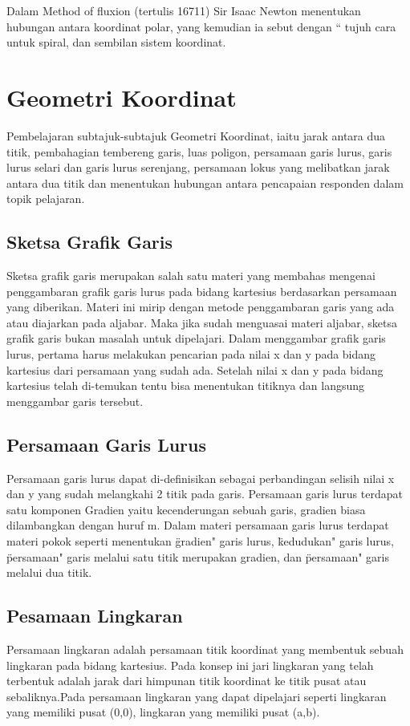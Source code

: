 Dalam Method of fluxion (tertulis 16711) Sir Isaac Newton menentukan hubungan antara koordinat polar, yang kemudian ia sebut dengan “ tujuh cara untuk spiral, dan sembilan sistem koordinat. 

\section{Geometri Koordinat}
 Pembelajaran subtajuk-subtajuk Geometri Koordinat, iaitu jarak antara dua titik, pembahagian tembereng garis, luas poligon, persamaan garis lurus, garis lurus selari dan garis lurus serenjang, persamaan lokus yang melibatkan jarak antara dua titik dan menentukan hubungan antara pencapaian responden dalam topik pelajaran\cite{shong2013analisis}.
 
 \subsection{Sketsa Grafik Garis}
 Sketsa grafik garis merupakan salah satu materi yang membahas mengenai penggambaran grafik garis lurus pada bidang kartesius berdasarkan persamaan yang diberikan. Materi ini mirip dengan metode penggambaran garis yang ada atau diajarkan pada aljabar. Maka jika sudah menguasai materi aljabar, sketsa grafik garis bukan masalah untuk dipelajari. Dalam menggambar grafik garis lurus, pertama harus melakukan pencarian pada nilai x dan y pada bidang kartesius dari persamaan yang sudah ada. Setelah nilai x dan y pada bidang kartesius telah di-temukan tentu bisa menentukan titiknya dan langsung menggambar garis tersebut.
 
 \subsection{Persamaan Garis Lurus}
 Persamaan garis lurus dapat di-definisikan sebagai perbandingan selisih nilai x dan y yang sudah melangkahi 2 titik pada garis. 
 Persamaan garis lurus terdapat satu komponen Gradien yaitu kecenderungan sebuah garis, gradien biasa dilambangkan dengan huruf m.
 Dalam materi persamaan garis lurus terdapat materi pokok seperti menentukan \"gradien" garis lurus, \"kedudukan" garis lurus,
 \"persamaan" garis melalui satu titik merupakan gradien, dan \"persamaan" garis melalui dua titik.
 
 \subsection{Pesamaan Lingkaran}
 Persamaan lingkaran adalah persamaan titik koordinat yang membentuk sebuah lingkaran pada bidang kartesius. Pada konsep ini jari lingkaran yang telah terbentuk adalah jarak dari himpunan titik koordinat ke titik pusat atau sebaliknya.Pada persamaan lingkaran yang dapat dipelajari seperti lingkaran yang memiliki pusat (0,0), lingkaran yang memiliki pusat (a,b).
 
